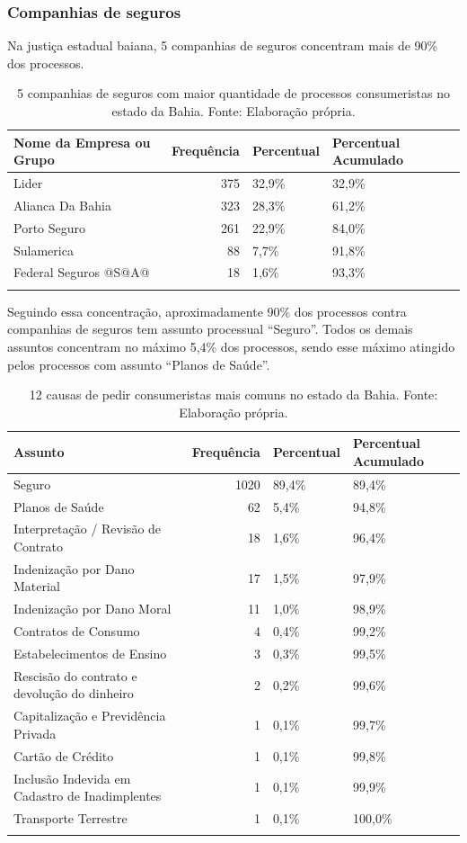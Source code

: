 \documentclass[]{report}
\begin{document}
\subsubsection{Companhias de seguros}\label{companhias-de-seguros}

Na justiça estadual baiana, 5 companhias de seguros concentram mais de
90\% dos processos.

\begin{longtable}{lrll}
\caption{5 companhias de seguros com maior quantidade de processos consumeristas no estado da Bahia. Fonte: Elaboração própria.} \\
  \hline
Nome da Empresa ou Grupo & Frequência & Percentual & Percentual Acumulado \\
  \hline
Lider & 375 & 32,9\% & 32,9\% \\
  Alianca Da
Bahia & 323 & 28,3\% & 61,2\% \\
  Porto Seguro & 261 & 22,9\% & 84,0\% \\
  Sulamerica &  88 & 7,7\% & 91,8\% \\
  Federal Seguros
@S@A@ &  18 & 1,6\% & 93,3\% \\
   \hline
\hline
\label{unnamed-chunk-71}
\end{longtable}

Seguindo essa concentração, aproximadamente 90\% dos processos contra
companhias de seguros tem assunto processual ``Seguro''. Todos os demais
assuntos concentram no máximo 5,4\% dos processos, sendo esse máximo
atingido pelos processos com assunto ``Planos de Saúde''.

\begin{longtable}{lrll}
\caption{12 causas de pedir consumeristas mais comuns no estado da Bahia. Fonte: Elaboração própria.} \\
  \hline
Assunto & Frequência & Percentual & Percentual Acumulado \\
  \hline
Seguro & 1020 & 89,4\% & 89,4\% \\
  Planos de Saúde &  62 & 5,4\% & 94,8\% \\
  Interpretação / Revisão de Contrato &  18 & 1,6\% & 96,4\% \\
  Indenização por Dano Material &  17 & 1,5\% & 97,9\% \\
  Indenização por Dano Moral &  11 & 1,0\% & 98,9\% \\
  Contratos de Consumo &   4 & 0,4\% & 99,2\% \\
  Estabelecimentos de Ensino &   3 & 0,3\% & 99,5\% \\
  Rescisão do contrato e devolução do dinheiro &   2 & 0,2\% & 99,6\% \\
  Capitalização e Previdência Privada &   1 & 0,1\% & 99,7\% \\
  Cartão de Crédito &   1 & 0,1\% & 99,8\% \\
  Inclusão Indevida em Cadastro de Inadimplentes &   1 & 0,1\% & 99,9\% \\
  Transporte Terrestre &   1 & 0,1\% & 100,0\% \\
   \hline
\hline
\label{unnamed-chunk-72}
\end{longtable}
\end{document}
